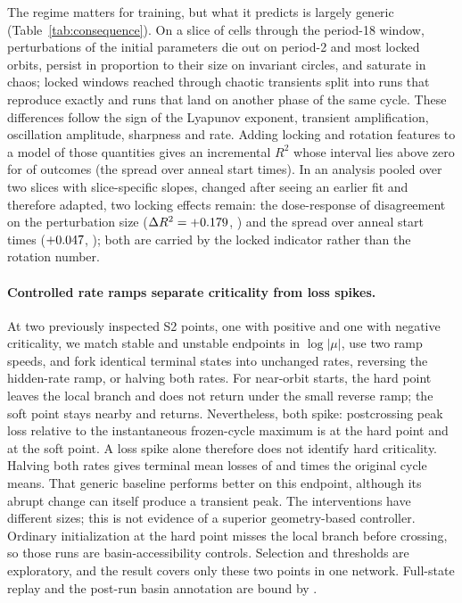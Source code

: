 \documentclass[11pt,letterpaper]{article}
\begin{document}
The regime matters for training, but what it predicts is largely generic (Table~\ref{tab:consequence}). On a slice
of \nConsCells{} cells through the period-18 window, perturbations of the initial parameters die out on period-2 and
most locked orbits, persist in proportion to their size on invariant circles, and saturate in chaos; locked windows
reached through chaotic transients split into runs that reproduce exactly and runs that land on another phase of
the same cycle. These differences follow the sign of the Lyapunov exponent, transient amplification, oscillation
amplitude, sharpness and rate. Adding locking and rotation features to a model of those quantities gives an
incremental $R^2$ whose interval lies above zero for \nConsAbove{} of \nConsOutcomes{} outcomes (the spread over
anneal start times). In an analysis pooled over two slices with slice-specific slopes, changed after seeing an
earlier fit and therefore adapted, two locking effects remain: the dose-response of disagreement on the
perturbation size ($\Delta R^2 = +0.179$, \tDoseGainCI{}) and the spread over anneal start times
($+0.047$, \tStopGainCI{}); both are carried by the locked indicator rather than the rotation number.

\paragraph{Controlled rate ramps separate criticality from loss spikes.} At two previously inspected S2
points, one with positive and one with negative criticality, we match stable and unstable endpoints in
$\log|\mu|$, use two ramp speeds, and fork identical terminal states into unchanged rates, reversing the hidden-rate
ramp, or halving both rates. For near-orbit starts, the hard point leaves the local branch and does not return
under the small reverse ramp; the soft point stays nearby and returns. Nevertheless, both spike: postcrossing
peak loss relative to the instantaneous frozen-cycle maximum is \tWarmHardPeak{} at the hard point and
\tWarmSoftPeak{} at the soft point. A loss spike alone therefore does not identify hard criticality.
Halving both rates gives terminal mean losses of \xWarmHardHalve{} and \xWarmSoftHalve{} times the original
cycle means. That generic baseline performs better on this endpoint, although its abrupt change can itself
produce a transient peak. The interventions have different sizes; this is not evidence of a superior
geometry-based controller. Ordinary initialization at the hard point misses the local branch before crossing,
so those runs are basin-accessibility controls. Selection and thresholds are exploratory, and the result covers
only these two points in one network. Full-state replay and the post-run basin annotation are bound by
.
\end{document}
